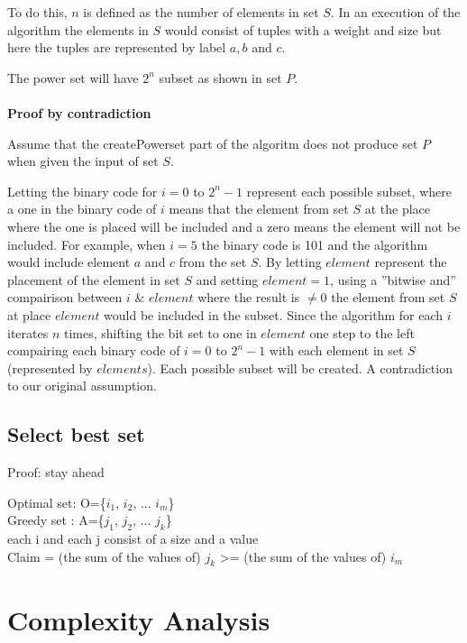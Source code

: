 \documentclass{inc/mas}
\begin{document}
To do this, $n$ is defined as the number of elements in set $S$. In an execution of the algorithm the elements in $S$ would consist of tuples with a weight and size but here the tuples are represented by label $a,b$ and $c$.

The power set will have $2^n$ subset as shown in set $P$.\\\\

\textbf{Proof by contradiction}

Assume that the createPowerset part of the algoritm does not produce set $P$ when given the input of set $S$.

Letting the binary code for $i = 0$ to $2^n-1$ represent each possible subset, where a one in the binary code of $i$ means that the element from set $S$ at the place where the one is placed will be included and a zero means the element will not be included. For example, when $i = 5$ the binary code is 101 and the algorithm would include element $a$ and $c$ from the set $S$. By letting $element$ represent the placement of the element in set $S$ and setting $element = 1$, using a ''bitwise and'' compairison between $i$ \& $element$ where the result is $\neq0$ the element from set $S$ at place $element$ would be included in the subset. Since the algorithm for each $i$ iterates $n$ times, shifting the bit set to one in $element$ one step to the left compairing each binary code of $i = 0$ to $2^n-1$ with each element in set $S$ (represented by $elements$). Each possible subset will be created. A contradiction to our original assumption.

\subsection{Select best set}

Proof: stay ahead 

Optimal set:  O=\{$i_1$, $i_2$, ... $i_m$\} \\
Greedy set :  A=\{$j_1$, $j_2$, ... $j_k$\} \\

each i and each j consist of a size and a value \\

Claim = (the sum of the values of) $j_k$ >= (the sum of the values of) $i_m$


\section{Complexity Analysis}
\end{document}
